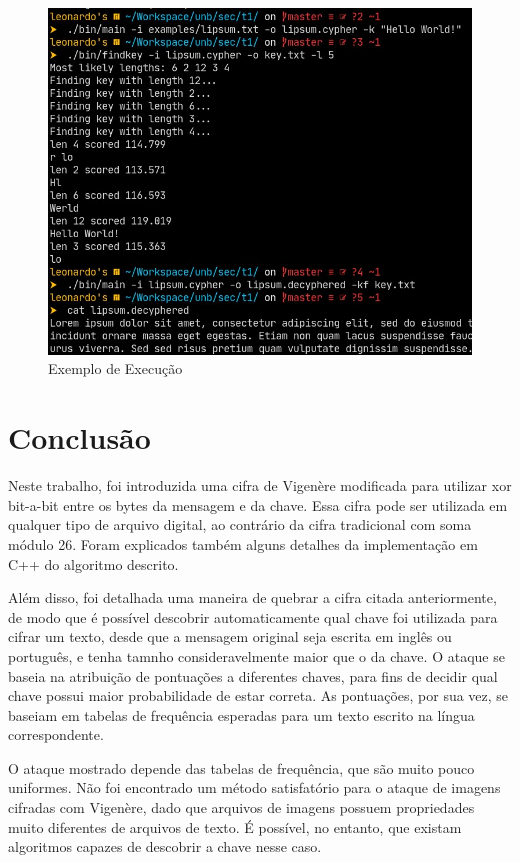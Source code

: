 \documentclass[conference]{IEEEtran}
\begin{document}
\begin{figure}[htbp]
    \centerline{\includegraphics[width=\linewidth]{img/ss1.jpg}}
\caption{Exemplo de Execução}
\label{fig:example}
\end{figure}


\section{Conclusão} %
\label{sec:conclusion}
Neste trabalho, foi introduzida uma cifra de Vigenère modificada para utilizar
xor bit-a-bit entre os bytes da mensagem e da chave. Essa cifra pode ser
utilizada em qualquer tipo de arquivo digital, ao contrário da cifra tradicional
com soma módulo 26. Foram explicados também alguns detalhes da implementação em
C++ do algoritmo descrito.

Além disso, foi detalhada uma maneira de quebrar a cifra citada anteriormente,
de modo que é possível descobrir automaticamente qual chave foi utilizada para
cifrar um texto, desde que a mensagem original seja escrita em inglês ou
português, e tenha tamnho consideravelmente maior que o da chave. O ataque se
baseia na atribuição de pontuações a diferentes chaves, para fins de decidir
qual chave possui maior probabilidade de estar correta. As pontuações, por sua
vez, se baseiam em tabelas de frequência esperadas para um texto escrito na
língua correspondente.

O ataque mostrado depende das tabelas de frequência, que são muito pouco
uniformes. Não foi encontrado um método satisfatório para o ataque de imagens
cifradas com Vigenère, dado que arquivos de imagens possuem propriedades muito
diferentes de arquivos de texto. É possível, no entanto, que existam algoritmos
capazes de descobrir a chave nesse caso.


% 


\end{document}
